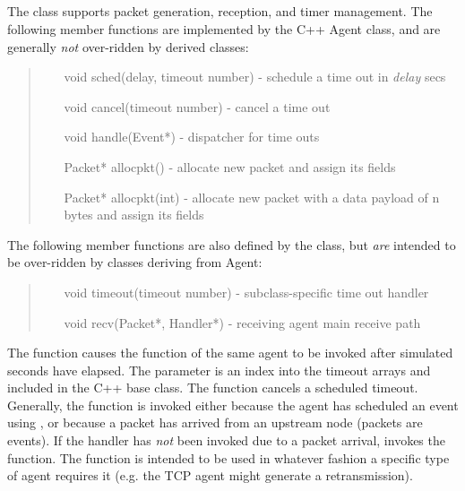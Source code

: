 \subsection{}

The  class supports packet generation, reception,
and timer management.
The following member functions are implemented by the C++ Agent class, and are
generally {\em not} over-ridden by derived classes:
\begin{tt}
\begin{quote}
\begin{itemize}
\item[void sched(delay, timeout number)] - schedule a time out in {\em delay} secs
\item[void cancel(timeout number)] - cancel a time out
\item[void handle(Event*)] - dispatcher for time outs
\item[Packet* allocpkt()] - allocate new packet and assign its fields
\item[Packet* allocpkt(int)] - allocate new packet with a data payload of n bytes and assign its fields
\end{itemize}
\end{quote}
\end{tt}
The following member functions are also defined by the  class,
but {\em are} intended to be over-ridden by classes deriving from Agent:
\begin{tt}
\begin{quote}
\begin{itemize}
        \item[void timeout(timeout number)] - subclass-specific time out handler
        \item[void recv(Packet*, Handler*)] - receiving agent main receive path
\end{itemize}
\end{quote}
\end{tt}
The  function causes the  function
of the same agent to be invoked after  simulated
seconds have elapsed.
The  parameter is an index into the
timeout arrays  and  included in the
C++  base class.
The  function cancels a scheduled timeout.
Generally, the  function is invoked either
because the agent has scheduled an event using , or
because a packet has arrived from an upstream node (packets are events).
If the handler has \emph{not} been invoked due to a packet arrival,
 invokes the  function.
The  function is intended to be used in whatever fashion
a specific type of agent requires it
(e.g. the TCP agent might generate a retransmission).


